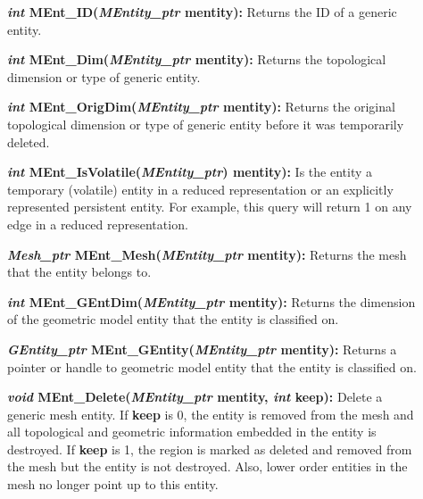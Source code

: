 \documentclass[12pt]{article}
\begin{document}
\begin{description}

  
\item[]{\bf {\em int} MEnt\_ID({\em MEntity\_ptr} mentity):} Returns
the ID of a generic entity.

\item[]{\bf {\em int} MEnt\_Dim({\em MEntity\_ptr} mentity):}
Returns the topological dimension or type of generic entity.

\item[]{\bf {\em int} MEnt\_OrigDim({\em MEntity\_ptr} mentity):}
Returns the original topological dimension or type of generic entity before it
was temporarily deleted.

\item[]{\bf {\em int} MEnt\_IsVolatile({\em MEntity\_ptr}) mentity):}
  Is the entity a temporary (volatile) entity in a reduced
  representation or an explicitly represented persistent entity. For
  example, this query will return 1 on any edge in a reduced
  representation.

\item[]{\bf {\em Mesh\_ptr} MEnt\_Mesh({\em MEntity\_ptr} mentity):}
Returns the mesh that the entity belongs to.

\item[]{\bf {\em int} MEnt\_GEntDim({\em MEntity\_ptr}
    mentity):} Returns the dimension of the geometric model entity
  that the entity is classified on.
  
\item[]{\bf {\em GEntity\_ptr}
    MEnt\_GEntity({\em MEntity\_ptr} mentity):} Returns a pointer
  or handle to geometric model entity that the entity is classified
  on.

\item[]{\bf {\em void} MEnt\_Delete({\em MEntity\_ptr} mentity, {\em
      int} keep):} Delete a generic mesh entity. If {\bf keep} is 0,
  the entity is removed from the mesh and all topological and
  geometric information embedded in the entity is destroyed. If {\bf
    keep} is 1, the region is marked as deleted and removed from the
  mesh but the entity is not destroyed. Also, lower order entities in
  the mesh no longer point up to this entity.

\item[]
  

\end{description}
\end{document}

